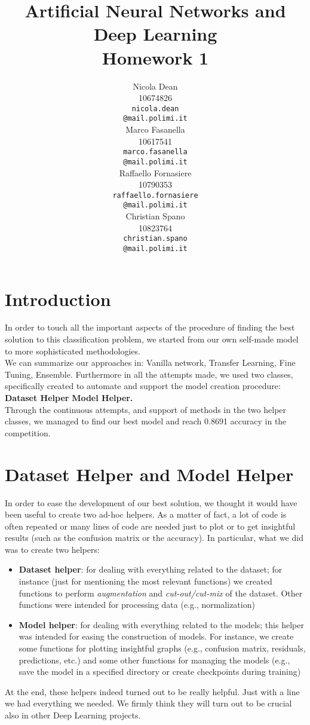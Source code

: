 \documentclass[11pt]{article}
\title{Artificial Neural Networks and Deep Learning \\
Homework 1}
\author{
  Nicola Dean \\
  10674826 \\
  {\tt nicola.dean \\
  \tt @mail.polimi.it} \\\And
  Marco Fasanella \\
  10617541 \\
  {\tt marco.fasanella \\
  \tt @mail.polimi.it} \\\And
  Raffaello Fornasiere \\
    10790353 \\
    {\tt raffaello.fornasiere \\
    \tt @mail.polimi.it} \\\And
  Christian Spano \\
  10823764 \\
  {\tt christian.spano \\
  \tt @mail.polimi.it} \\}
\date{}
\begin{document}
\maketitle



\section{Introduction}
In order to touch all the important aspects of the procedure of finding the best solution to this classification problem,
we started from our own self-made model to more sophisticated methodologies.\\[0.1cm]
 We can summarize our approaches in: Vanilla network, Transfer Learning, Fine Tuning, Ensemble. Furthermore in all the attempts made, we used two classes, specifically created to automate and support the model creation
procedure: \textbf{Dataset Helper} \textbf{Model Helper.}\\[0.1cm]
Through the continuous attempts, and support of methods in the two helper classes, we managed to find our best model and
reach 0.8691 accuracy in the competition.


\section{Dataset Helper and Model Helper}
In order to ease the development of our best solution, we thought it would have been useful to create two ad-hoc helpers. As a matter of fact, a lot of code is often repeated or many lines of code are needed just to plot or to get insightful results (such as the confusion matrix or the accuracy). In particular, what we did was to create two helpers:
\begin{itemize}
    \item \textbf{Dataset helper}: for dealing with everything related to the dataset; for instance (just for mentioning the most relevant functions) we created functions to perform \textit{augmentation} and \textit{cut-out/cut-mix} of the dataset. Other functions were intended for processing data (e.g., normalization)
    \item \textbf{Model helper}: for dealing with everything related to the models; this helper was intended for easing the construction of models. For instance, we create some functions for plotting insightful graphs (e.g., confusion matrix, residuals, predictions, etc.) and some other functions for managing the models (e.g., save the model in a specified directory or create checkpoints during training)
\end{itemize}
At the end, these helpers indeed turned out to be really helpful. Just with a line we had everything we needed. We firmly think they will turn out to be crucial also in other Deep Learning projects.
\end{document}
